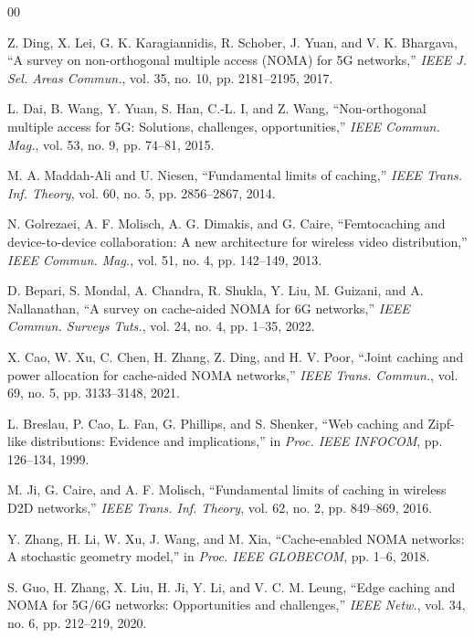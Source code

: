 \documentclass[conference]{IEEEtran}
\begin{document}
\begin{thebibliography}{00}

Z. Ding, X. Lei, G. K. Karagiannidis, R. Schober, J. Yuan, and V. K. Bhargava,
``A survey on non-orthogonal multiple access (NOMA) for 5G networks,''
\textit{IEEE J. Sel. Areas Commun.}, vol. 35, no. 10, pp. 2181--2195, 2017.

L. Dai, B. Wang, Y. Yuan, S. Han, C.-L. I, and Z. Wang,
``Non-orthogonal multiple access for 5G: Solutions, challenges, opportunities,''
\textit{IEEE Commun. Mag.}, vol. 53, no. 9, pp. 74--81, 2015.

M. A. Maddah-Ali and U. Niesen,
``Fundamental limits of caching,''
\textit{IEEE Trans. Inf. Theory}, vol. 60, no. 5, pp. 2856--2867, 2014.

N. Golrezaei, A. F. Molisch, A. G. Dimakis, and G. Caire,
``Femtocaching and device-to-device collaboration: A new architecture for wireless video distribution,''
\textit{IEEE Commun. Mag.}, vol. 51, no. 4, pp. 142--149, 2013.

D. Bepari, S. Mondal, A. Chandra, R. Shukla, Y. Liu, M. Guizani, and A. Nallanathan,
``A survey on cache-aided NOMA for 6G networks,''
\textit{IEEE Commun. Surveys Tuts.}, vol. 24, no. 4, pp. 1--35, 2022.

X. Cao, W. Xu, C. Chen, H. Zhang, Z. Ding, and H. V. Poor,
``Joint caching and power allocation for cache-aided NOMA networks,''
\textit{IEEE Trans. Commun.}, vol. 69, no. 5, pp. 3133--3148, 2021.

L. Breslau, P. Cao, L. Fan, G. Phillips, and S. Shenker,
``Web caching and Zipf-like distributions: Evidence and implications,''
in \textit{Proc. IEEE INFOCOM}, pp. 126--134, 1999.

M. Ji, G. Caire, and A. F. Molisch,
``Fundamental limits of caching in wireless D2D networks,''
\textit{IEEE Trans. Inf. Theory}, vol. 62, no. 2, pp. 849--869, 2016.

Y. Zhang, H. Li, W. Xu, J. Wang, and M. Xia,
``Cache-enabled NOMA networks: A stochastic geometry model,''
in \textit{Proc. IEEE GLOBECOM}, pp. 1--6, 2018.

S. Guo, H. Zhang, X. Liu, H. Ji, Y. Li, and V. C. M. Leung,
``Edge caching and NOMA for 5G/6G networks: Opportunities and challenges,''
\textit{IEEE Netw.}, vol. 34, no. 6, pp. 212--219, 2020.


\end{thebibliography}
\end{document}

